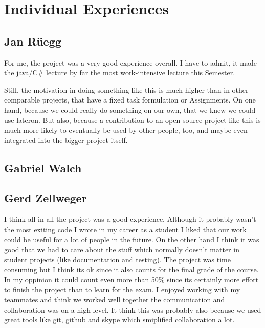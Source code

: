 \section{Individual Experiences}
\label{individual}

\subsection{Jan Rüegg}
\label{individual:jan}
For me, the project was a very good experience overall. I have to admit, it made the java/C\# lecture by far the most work-intensive lecture this Semester.

Still, the motivation in doing something like this is much higher than in other comparable projects, that have a fixed task formulation or Assignments. On one hand, because we could really do something on our own, that we knew we could use lateron. But also, because a contribution to an open source project like this is much more likely to eventually be used by other people, too, and maybe even integrated into the bigger project itself.

\subsection{Gabriel Walch}
\label{individual:gabriel}

\subsection{Gerd Zellweger}
\label{individual:gerd}
I think all in all the project was a good experience. Although it probably wasn't the most exiting code I wrote in my career as a student I liked that our work could be useful for a lot of people in the future. On the other hand I think it was good that we had to care about the stuff which normally doesn't matter in student projects (like documentation and testing). The project was time consuming but I think its ok since it also counts for the final grade of the course. In my oppinion it could count even more than 50\% since its certainly more effort to finish the project than to learn for the exam.
I enjoyed working with my teammates and think we worked well together the communication and collaboration was on a high level. It think this was probably also because we used great tools like git, github and skype which smiplified collaboration a lot.


